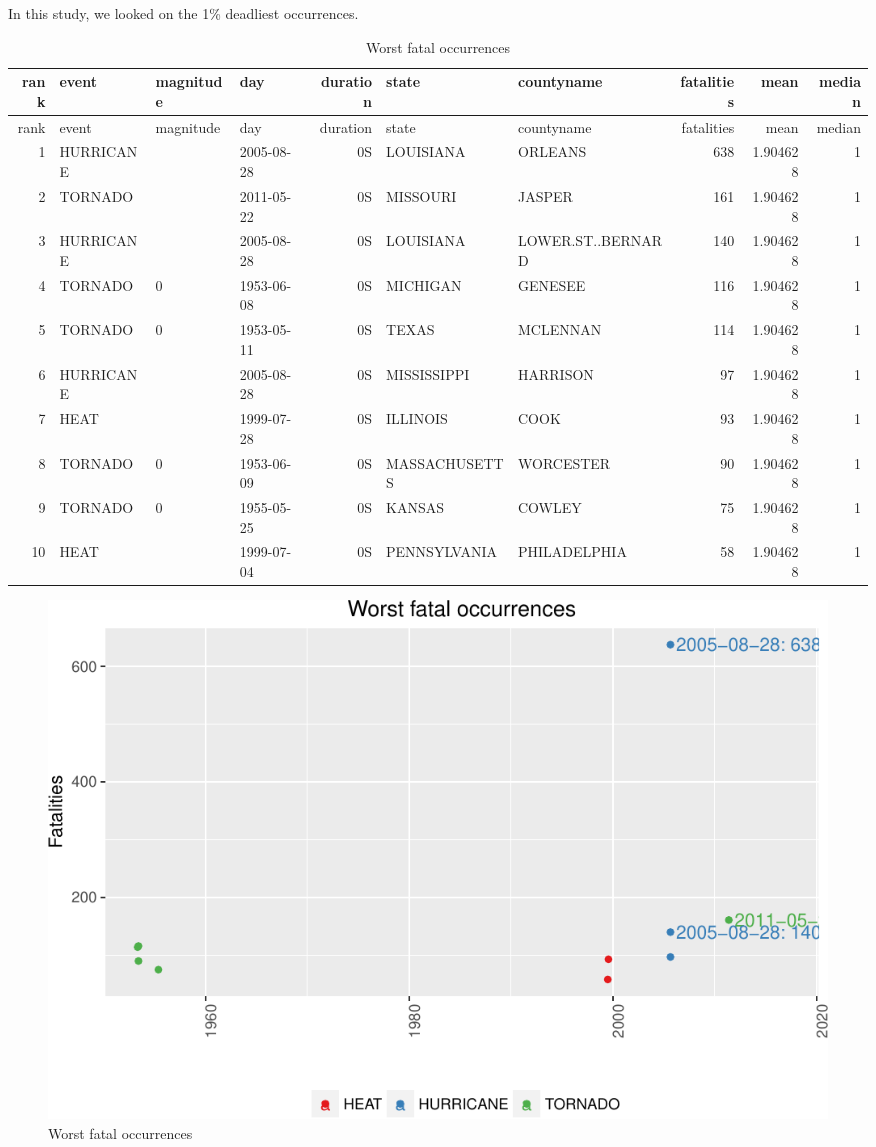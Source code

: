 \documentclass[]{article}
\begin{document}
In this study, we looked on the 1\% deadliest occurrences.

\begin{longtable}[]{@{}rlllrllrrr@{}}
\caption{Worst fatal occurrences}\tabularnewline
\toprule
rank & event & magnitude & day & duration & state & countyname &
fatalities & mean & median\tabularnewline
\midrule
\endfirsthead
\toprule
rank & event & magnitude & day & duration & state & countyname &
fatalities & mean & median\tabularnewline
\midrule
\endhead
1 & HURRICANE & & 2005-08-28 & 0S & LOUISIANA & ORLEANS & 638 & 1.904628
& 1\tabularnewline
2 & TORNADO & & 2011-05-22 & 0S & MISSOURI & JASPER & 161 & 1.904628 &
1\tabularnewline
3 & HURRICANE & & 2005-08-28 & 0S & LOUISIANA & LOWER.ST..BERNARD & 140
& 1.904628 & 1\tabularnewline
4 & TORNADO & 0 & 1953-06-08 & 0S & MICHIGAN & GENESEE & 116 & 1.904628
& 1\tabularnewline
5 & TORNADO & 0 & 1953-05-11 & 0S & TEXAS & MCLENNAN & 114 & 1.904628 &
1\tabularnewline
6 & HURRICANE & & 2005-08-28 & 0S & MISSISSIPPI & HARRISON & 97 &
1.904628 & 1\tabularnewline
7 & HEAT & & 1999-07-28 & 0S & ILLINOIS & COOK & 93 & 1.904628 &
1\tabularnewline
8 & TORNADO & 0 & 1953-06-09 & 0S & MASSACHUSETTS & WORCESTER & 90 &
1.904628 & 1\tabularnewline
9 & TORNADO & 0 & 1955-05-25 & 0S & KANSAS & COWLEY & 75 & 1.904628 &
1\tabularnewline
10 & HEAT & & 1999-07-04 & 0S & PENNSYLVANIA & PHILADELPHIA & 58 &
1.904628 & 1\tabularnewline
\bottomrule
\end{longtable}

\begin{figure}[htbp]
\centering
\includegraphics{readme_files/figure-latex/fatal-plot-single-1.pdf}
\caption{Worst fatal occurrences}
\end{figure}
\end{document}
